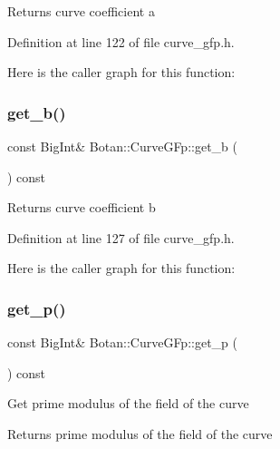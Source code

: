 \begin{DoxyReturn}{Returns}
curve coefficient a 
\end{DoxyReturn}


Definition at line 122 of file curve\+\_\+gfp.\+h.

Here is the caller graph for this function\+:
\mbox{\label{class_botan_1_1_curve_g_fp_ac5dfeca3af6f79d62334b1efd5392764}} 
\subsubsection{\texorpdfstring{get\+\_\+b()}{get\_b()}}
{\footnotesize\ttfamily const Big\+Int\& Botan\+::\+Curve\+G\+Fp\+::get\+\_\+b (\begin{DoxyParamCaption}{ }\end{DoxyParamCaption}) const\hspace{0.3cm}{\ttfamily [inline]}}

\begin{DoxyReturn}{Returns}
curve coefficient b 
\end{DoxyReturn}


Definition at line 127 of file curve\+\_\+gfp.\+h.

Here is the caller graph for this function\+:
\mbox{\label{class_botan_1_1_curve_g_fp_ae2fbbaf2290f610c23719a395e935f1e}} 
\subsubsection{\texorpdfstring{get\+\_\+p()}{get\_p()}}
{\footnotesize\ttfamily const Big\+Int\& Botan\+::\+Curve\+G\+Fp\+::get\+\_\+p (\begin{DoxyParamCaption}{ }\end{DoxyParamCaption}) const\hspace{0.3cm}{\ttfamily [inline]}}

Get prime modulus of the field of the curve \begin{DoxyReturn}{Returns}
prime modulus of the field of the curve 
\end{DoxyReturn}


